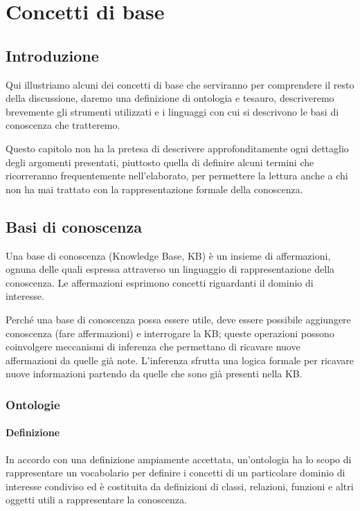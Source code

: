 \chapter{Concetti di base}

\section{Introduzione}
Qui illustriamo alcuni dei concetti di base che serviranno per comprendere il resto della discussione, daremo una definizione di ontologia e tesauro, descriveremo brevemente gli strumenti utilizzati e i linguaggi con cui si descrivono le basi di conoscenza che tratteremo.

Questo capitolo non ha la pretesa di descrivere approfonditamente ogni dettaglio degli argomenti presentati, piuttosto quella di definire alcuni termini che ricorreranno frequentemente nell'elaborato, per permettere la lettura anche a chi non ha mai trattato con la rappresentazione formale della conoscenza.


\section{Basi di conoscenza}
Una base di conoscenza (Knowledge Base, KB) è un insieme di affermazioni, ognuna delle quali espressa attraverso un linguaggio di rappresentazione della conoscenza. Le affermazioni esprimono concetti riguardanti il dominio di interesse.

Perché una base di conoscenza possa essere utile, deve essere possibile aggiungere conoscenza (fare affermazioni) e interrogare la KB; queste operazioni possono coinvolgere meccanismi di inferenza che permettano di ricavare nuove affermazioni da quelle già note. L'inferenza sfrutta una logica formale per ricavare nuove informazioni partendo da quelle che sono già presenti nella KB\cite{russell2010artificial}.
\subsection{Ontologie}
\subsubsection{Definizione}
In accordo con una definizione ampiamente accettata\cite{hitzler2021review}, un'ontologia ha lo scopo di rappresentare un vocabolario per definire i concetti di un particolare dominio di interesse condiviso ed è costituita da definizioni di classi, relazioni, funzioni e altri oggetti utili a rappresentare la conoscenza\cite{gruber1993translation}. 


